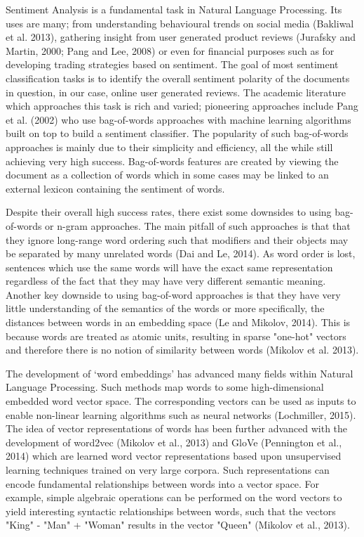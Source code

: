 \documentclass[conference]{IEEEtran}
\begin{document}
Sentiment Analysis is a fundamental task in Natural Language Processing. Its uses are many; from understanding behavioural trends on social media (Bakliwal et al. 2013), gathering insight from user generated product reviews (Jurafsky and Martin, 2000; Pang and Lee, 2008) or even for financial purposes such as for developing trading strategies based on sentiment. The goal of most sentiment classification tasks is to identify the overall sentiment polarity of the documents in question, in our case, online user generated reviews. The academic literature which approaches this task is rich and varied; pioneering approaches include Pang et al. (2002) who use bag-of-words approaches with machine learning algorithms built on top to build a sentiment classifier. The popularity of such bag-of-words approaches is mainly due to their simplicity and efficiency, all the while still achieving very high success. Bag-of-words features are created by viewing the document as a collection of words which in some cases may be linked to an external lexicon containing the sentiment of words. 

Despite their overall high success rates, there exist some downsides to using bag-of-words or n-gram approaches. The main pitfall of such approaches is that that they ignore long-range word ordering such that modifiers and their objects may be separated by many unrelated words (Dai and Le, 2014). As word order is lost, sentences which use the same words will have the exact same representation regardless of the fact that they may have very different semantic meaning. Another key downside to using bag-of-word approaches is that they have very little understanding of the semantics of the words or more specifically, the distances between words in an embedding space (Le and Mikolov, 2014). This is because words are treated as atomic units, resulting in sparse "one-hot" vectors and therefore there is no notion of similarity between words (Mikolov et al. 2013). 

The development of ‘word embeddings’ has advanced many fields within Natural Language Processing. Such methods map words to some high-dimensional embedded word vector space. The corresponding vectors can be used as inputs to enable non-linear learning algorithms such as neural networks (Lochmiller, 2015). The idea of vector representations of words has been further advanced with the development of word2vec (Mikolov et al., 2013) and GloVe (Pennington et al., 2014) which are learned word vector representations based upon unsupervised learning techniques trained on very large corpora. Such representations can encode fundamental relationships between words into a vector space. For example, simple algebraic operations can be performed on the word vectors to yield interesting syntactic relationships between words, such that the vectors "King" - "Man" + "Woman" results in the vector "Queen" (Mikolov et al., 2013). 
\end{document}
